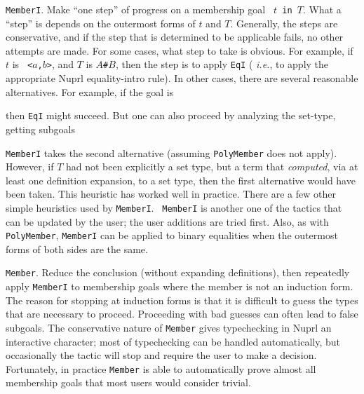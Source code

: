 {\tt MemberI}.  Make ``one step'' of progress on a membership goal {\tt
$t$~in~$T$}.  What a ``step'' is depends on the outermost forms of $t$ and $T$.
Generally, the steps are conservative, and if the step that is determined to be
applicable fails, no other attempts are made.
For some cases, what step to take is obvious.  For example, if $t$ is {\tt
<$a$,$b$>}, and $T$ is {\tt $A$\#$B$}, then the step is to apply {\tt EqI} ({\em
i.e.}, to apply the appropriate Nuprl equality-intro rule).  In other cases,
there are several reasonable alternatives.  For example, if the goal is 
\begin{Numath}
\end{Numath}%
then {\tt EqI} might succeed.  But one can also proceed by analyzing the
set-type, getting subgoals
\begin{Numath}
\end{Numath}%
{\tt MemberI} takes the second alternative (assuming {\tt PolyMember} does not
apply).  However, if $T$ had not been explicitly a set type, but a term
that {\em computed}, via at least one definition expansion, to a set type,
then
the first alternative would have been taken.  This heuristic has worked well in
practice.  There are a few other simple heuristics used by {\tt MemberI}.  {\tt
MemberI} is another one of the tactics that can be updated by the user; the user
additions are tried first.  Also, as with {\tt PolyMember}, {\tt MemberI} can be
applied to binary equalities when the outermost forms of both sides are the
same.

{\tt Member}.  Reduce the conclusion (without expanding definitions), then
repeatedly apply {\tt MemberI} to membership goals where the member is not an
induction form.  The reason for stopping at induction forms is that it is
difficult to guess the types that are necessary to proceed.  Proceeding with bad
guesses can often lead to false subgoals.  
The conservative nature of {\tt Member} gives typechecking in Nuprl an
interactive character; most of typechecking can be handled automatically, but
occasionally the tactic will stop and require the user to make a
decision.  Fortunately, in practice {\tt Member} is able to automatically prove
almost all membership goals that most users would consider trivial.

